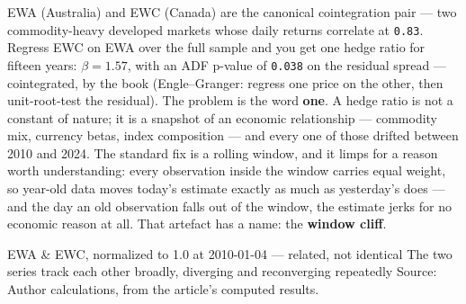 \documentclass{pyportfolios-note}
\begin{document}
EWA (Australia) and EWC (Canada) are the canonical cointegration pair — two
commodity-heavy developed markets whose daily returns correlate at
\texttt{0.83}. Regress EWC on EWA over the full sample and you get one hedge
ratio for fifteen years: $\beta = 1.57$, with an ADF p-value of \texttt{0.038} on
the residual spread — cointegrated, by the book (Engle–Granger: regress one price
on the other, then unit-root-test the residual). The problem is the word
\textbf{one}. A hedge ratio is not a constant of nature; it is a snapshot of an
economic relationship — commodity mix, currency betas, index composition — and
every one of those drifted between 2010 and 2024. The standard fix is a rolling
window, and it limps for a reason worth understanding: every observation inside
the window carries equal weight, so year-old data moves today's estimate exactly
as much as yesterday's does — and the day an old observation falls out of the
window, the estimate jerks for no economic reason at all. That artefact has a
name: the \textbf{window cliff}.

  {EWA \& EWC, normalized to 1.0 at 2010-01-04 — related, not identical}
  {The two series track each other broadly, diverging and reconverging
   repeatedly}
  {Source: Author calculations, from the article's computed results.}


\noteneedroom{190bp}
\end{document}
